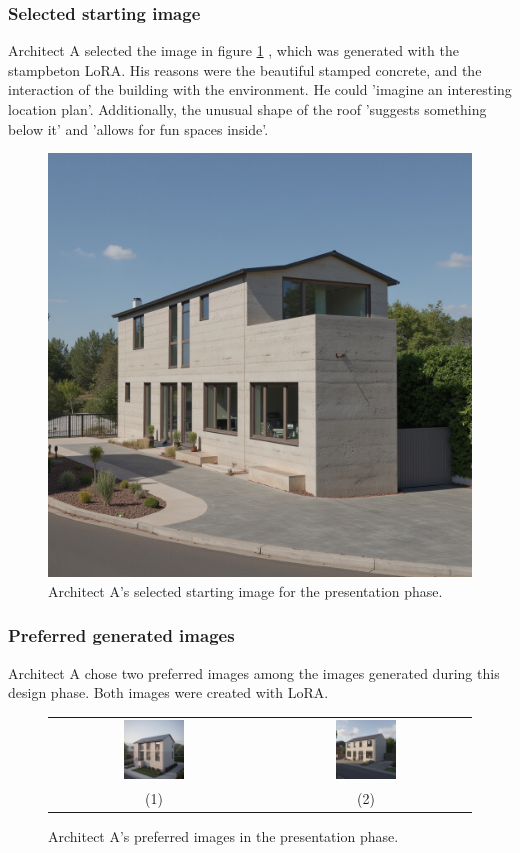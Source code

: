 \subsubsection{Selected starting image}
Architect A selected the image in figure \ref{fig:A-presentation-selected} , which was generated with the stampbeton LoRA. His reasons were the beautiful stamped concrete, and the interaction of the building with the environment. He could 'imagine an interesting location plan'. Additionally, the unusual shape of the roof 'suggests something below it' and 'allows for fun spaces inside'.
\begin{figure}[H]
    \centering
    \includegraphics[width=0.3\linewidth]{Images/Methodology/Evaluation sessions/DMOA_Fixed-images/3-presentation/Met_lora_00097_.png}
    \caption{Architect A's selected starting image for the presentation phase.}
    \label{fig:A-presentation-selected}
\end{figure}

\subsubsection{Preferred generated images}
Architect A chose two preferred images among the images generated during this design phase. Both images were created with LoRA.
\begin{figure}[H]
    \centering
    \begin{tabular}{cc}
        \includegraphics[width=0.3\textwidth]{Images/Results/Architect A/3. Presentation phase/Met_lora_00002_.png} & \includegraphics[width=0.3\textwidth]{Images/Results/Architect A/3. Presentation phase/Met_lora_00006_.png}\\ 
        (1) & (2)\\
    \end{tabular}
    \caption{Architect A's preferred images in the presentation phase.}
    \label{fig:A-presentation-preferred}
\end{figure}
